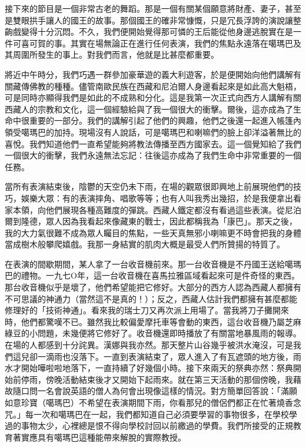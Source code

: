 接下來的節目是一個非常古老的舞蹈。那是一個有關某個願意將財產、妻子，甚至是雙眼拱手讓人的國王的故事。那個國王的確非常慷慨，只是冗長浮誇的演說讓整齣戲變得十分沉悶。不久，我們便開始覺得那可憐的王后能從他身邊逃脫實在是一件可喜可賀的事。其實在場無論正在進行任何表演，我們的焦點永遠落在噶瑪巴及其周圍所發生的事上。對我們而言，他就是比甚麼都重要。

將近中午時分，我們巧遇一群參加豪華遊的義大利遊客，於是便開始向他們講解有關藏傳佛教的種種。儘管南歐民族在西藏和尼泊爾人身邊看起來是如此高大魁梧，可是同時亦顯得我們是如此的不成熟和分化。這是我第一次正式向西方人講解有關西藏人的宗教和文化，這一個經驗給與了我一個很大的衝擊。爾後，這亦成為了生命中很重要的一部分。我們的講解引起了他們的興趣，他們之後還一起進入帳篷內領受噶瑪巴的加持。現場沒有人說話，可是噶瑪巴和喇嘛們的臉上卻洋溢著無比的喜悅。我們知道他們一直希望能夠將教法傳播至西方國家去。這一個覺知給了我們一個很大的衝擊，我們永遠無法忘記：往後這亦成為了我們生命中非常重要的一個任務。

當所有表演結束後，陰鬱的天空仍未下雨，在場的觀眾很即興地上前展現他們的技巧，娛樂大眾：有的表演摔角、唱歌等等；也有人叫我秀出幾招，於是我便拿出看家本領，向他們展現各種高難度的彈跳。西藏人鐵定都沒有看過這些表演。從尼泊爾到隆德，眾人因為我看起來像藏東的戰士，因此都稱我為「康巴」。那天之後，我的大力氣很難不成為眾人矚目的焦點，一些天真無邪小喇嘛更不時會把我的身體當成樹木般攀爬嬉戲。我那一身結實的肌肉大概是最受人們所贊揚的特質了。

在表演的間歇期間，某人拿了一台收音機前來。那一台收音機是不丹國王送給噶瑪巴的禮物。一九七Ο年，這一台收音機在喜馬拉雅區域看起來可是件奇怪的東西。那台收音機似乎是壞了，他們希望能把它修好。大部分的西方人認為西藏人都擁有不可思議的神通力（當然這不是真的！）；反之，西藏人估計我們都擁有甚麼都能修理好的「技術神通」。看來我的瑞士刀又再次派上用場了。當我將刀子攤開來時，他們都驚嘆不已。雖然我比較偏愛摩托車等會動的東西，這台收音機乃屬芝麻綠豆的小問題，未幾便將它修好了。收音機還即時播放了有關當地暴風雨的報導。在場的人都感到十分詫異。漢娜與我亦然。那天整片山谷幾乎被洪水淹沒，可是我們這兒卻一滴雨也沒落下。一直到表演結束了，眾人進入了有瓦遮頭的地方後，雨水才開始嘩啦啦地落下，一直持續了好幾個小時。接下來兩天的祭典亦然：祭典開始前停雨，傍晚活動結束後才又開始下起雨來。就在第三天活動的那個傍晚，我藉故隨口問一名會說英語的僧人為何會出現像這樣的情況。對方簡單回答說：「滿願如意珍寶（噶瑪巴）不希望在表演期間下雨，你看那兒的僧侶們都正在忙著燒香念咒。」每一次和噶瑪巴在一起，我們都知道自己必須要學習的事物很多，在學校學過的事物太少，心裡總是恨不得向學校討回以前繳過的學費。我們所接受的正規教育著實應具有噶瑪巴這種能帶來解脫的實際教授。
